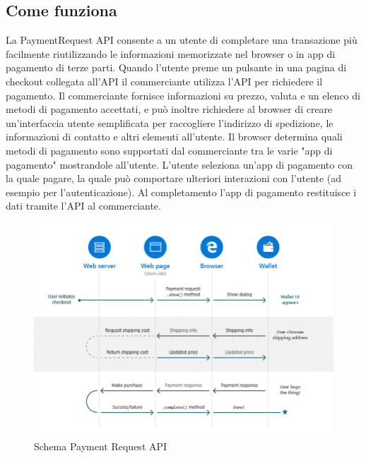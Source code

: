 \documentclass[11pt ,a4paper , twoside , openright ]{book}
\begin{document}
	\subsection{Come funziona}	
	La PaymentRequest API consente a un utente di completare una transazione più facilmente riutilizzando le informazioni memorizzate nel browser o in app di pagamento di terze parti.
	Quando l'utente preme un pulsante in una pagina di checkout collegata all'API il commerciante utilizza l'API per richiedere il pagamento. Il commerciante fornisce informazioni su prezzo, valuta e un elenco di metodi di pagamento accettati, e può inoltre richiedere al browser di creare un'interfaccia utente semplificata per raccogliere l'indirizzo di spedizione, le informazioni di contatto e altri elementi all'utente.
	Il browser determina quali metodi di pagamento sono supportati dal commerciante tra le varie "app di pagamento" mostrandole all'utente. 
	L'utente seleziona un'app di pagamento con la quale pagare, la quale può comportare ulteriori interazioni con l'utente (ad esempio per l'autenticazione). 
	Al completamento l'app di pagamento restituisce i dati tramite l'API al commerciante.
	
	\begin{figure}[h]
		\centering
		\includegraphics[width=1\linewidth]{SchemaPayment}
		\caption{Schema Payment Request API \cite{rif17}}
		\label{fig:Schema Payment}
	\end{figure}
	\pagebreak
	
\end{document}
